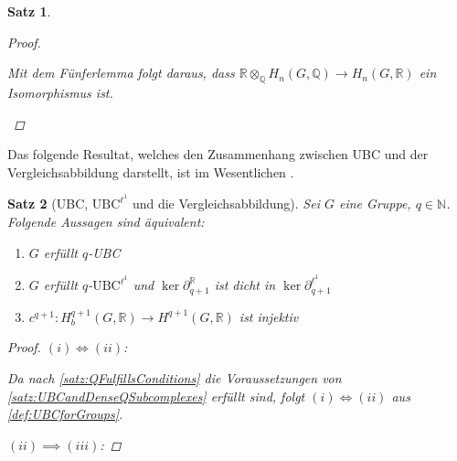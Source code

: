 \documentclass[a4paper,twoside,10pt]{scrreprt}
\newcommand{\N}{\mathbb{N}}
\newcommand{\Q}{\mathbb{Q}}
\newcommand{\R}{\mathbb{R}}
\newtheorem{satz}{Satz}[section]
\theoremstyle{definition}
\begin{document}
\begin{satz}
\begin{proof}
\begin{itemize}
\begin{center}
\end{center}
Mit dem Fünferlemma folgt daraus, dass $\R\otimes_{\Q}H_n(G,\Q)\to H_n(G,\R)$ ein Isomorphismus ist.
\end{itemize}
\end{proof}
\end{satz}

Das folgende Resultat, welches den Zusammenhang zwischen UBC und der Vergleichsabbildung darstellt, ist im Wesentlichen \cite[Theorem 2.8]{matsumoto}.

\begin{satz}[UBC, $\text{UBC}^{\ell^1}$ und die Vergleichsabbildung]\label{satz:UBCandComparisonMap}
Sei $G$ eine Gruppe, $q\in \N$. Folgende Aussagen sind äquivalent:
\renewcommand{\labelenumi}{(\roman{enumi}) }
\begin{enumerate}
\item $G$ erfüllt $q$-UBC
\item $G$ erfüllt $q$-$\text{UBC}^{\ell^1}$ und $\ker \partial_{q+1}^{\R}$ ist dicht in $\ker \partial_{q+1}^{\ell^1}$
\item $c^{q+1}:H_b^{q+1}(G,\R)\to H^{q+1}(G,\R)$ ist injektiv
\end{enumerate}
\begin{proof}
$(i)\Longleftrightarrow(ii)$:\par
Da nach \cref{satz:QFulfillsConditions} die Voraussetzungen von \cref{satz:UBCandDenseQSubcomplexes} erfüllt sind, folgt $(i)\Longleftrightarrow(ii)$ aus \cref{def:UBCforGroups}.\par\noindent
$(ii)\implies (iii)$:\par

\end{proof}
\end{satz}
\end{document}

